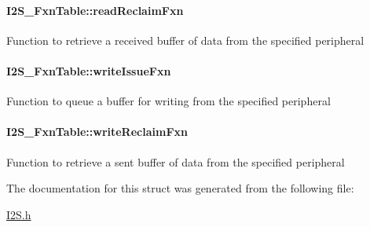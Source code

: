 \paragraph[{read\+Reclaim\+Fxn}]{ I2\+S\+\_\+\+Fxn\+Table\+::read\+Reclaim\+Fxn}\label{struct_i2_s___fxn_table_aa13910b4544fdf48044543614915b769}
Function to retrieve a received buffer of data from the specified peripheral 
\paragraph[{write\+Issue\+Fxn}]{ I2\+S\+\_\+\+Fxn\+Table\+::write\+Issue\+Fxn}\label{struct_i2_s___fxn_table_a8213ff3590792c7d5044ff7959f2c68a}
Function to queue a buffer for writing from the specified peripheral 
\paragraph[{write\+Reclaim\+Fxn}]{ I2\+S\+\_\+\+Fxn\+Table\+::write\+Reclaim\+Fxn}\label{struct_i2_s___fxn_table_a829e8e190e442f69e19d2568a339409a}
Function to retrieve a sent buffer of data from the specified peripheral 

The documentation for this struct was generated from the following file\+:\begin{DoxyCompactItemize}
\item 
\hyperlink{_i2_s_8h}{I2\+S.\+h}\end{DoxyCompactItemize}
